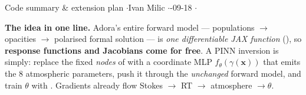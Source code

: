 


%
{Code summary \& extension plan \quad$\cdot$\quad Ivan Milic \quad$\cdot$-09-18 \quad$\cdot$}

\textbf{The idea in one line.} Adora's entire forward model --- populations $\to$ opacities $\to$
polarised formal solution --- is \emph{one differentiable JAX function} (), so
\textbf{response functions and Jacobians come for free}. A PINN inversion is simply: replace the
fixed \emph{nodes} of  with a coordinate MLP $f_\theta(\gamma(\mathbf{x}))$ that emits
the 8 atmospheric parameters, push it through the \emph{unchanged} forward model, and train $\theta$
with . Gradients already flow Stokes $\to$ RT $\to$ atmosphere $\to\theta$.

